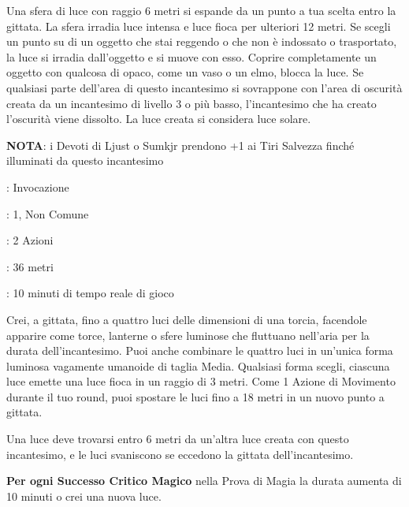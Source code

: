 \begin{multicols}{2}
Una sfera di luce con raggio 6 metri si espande da un punto a tua scelta entro la gittata. La sfera irradia luce intensa e luce fioca per ulteriori 12 metri. Se scegli un punto su di un oggetto che stai reggendo o che non è indossato o trasportato, la luce si irradia dall'oggetto e si muove con esso. Coprire completamente un oggetto con qualcosa di opaco, come un vaso o un elmo, blocca la luce. Se qualsiasi parte dell'area di questo incantesimo si sovrappone con l'area di oscurità creata da un incantesimo di livello 3 o più basso, l'incantesimo che ha creato l'oscurità viene dissolto. La luce creata si considera luce solare.

\textbf{NOTA}: i Devoti di Ljust o Sumkjr prendono +1 ai Tiri Salvezza finché illuminati da questo incantesimo

\noindent\colorbox{OBSSgold!10}{
\begin{minipage}{0.95\linewidth}
\begin{description}[noitemsep, topsep=0pt, parsep=0pt, partopsep=0pt, leftmargin=0cm, labelwidth=1.3cm]
	\item[\textbf{Lista}]: Invocazione
	\item[\textbf{Livello}]: 1, Non Comune
	\item[\textbf{Lancio}]: 2 Azioni
	\item[\textbf{Gittata}]: 36 metri
	\item[\textbf{Durata}]: 10 minuti di tempo reale di gioco
\end{description}
\end{minipage}}\smallskip

Crei, a gittata, fino a quattro luci delle dimensioni di una torcia, facendole apparire come torce, lanterne o sfere luminose che fluttuano nell'aria per la durata dell'incantesimo. Puoi anche combinare le quattro luci in un'unica forma luminosa vagamente umanoide di taglia Media. Qualsiasi forma scegli, ciascuna luce emette una luce fioca in un raggio di 3 metri. Come 1 Azione di Movimento durante il tuo round, puoi spostare le luci fino a 18 metri in un nuovo punto a gittata.

Una luce deve trovarsi entro 6 metri da un'altra luce creata con questo incantesimo, e le luci svaniscono se eccedono la gittata dell'incantesimo.

\textbf{Per ogni Successo Critico Magico} nella Prova di Magia la durata aumenta di 10 minuti o crei una nuova luce.


\end{multicols}
